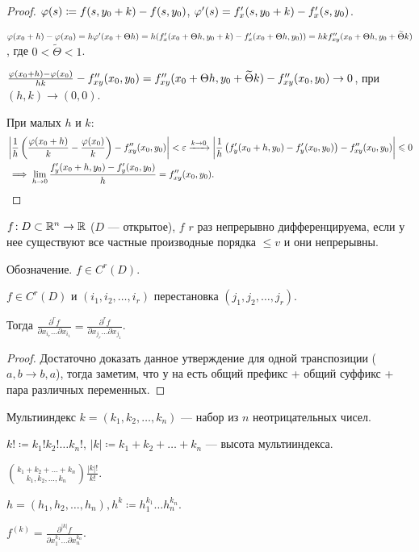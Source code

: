 \begin{proof}
    $\varphi(s) \coloneqq f(s, y_0 + k) - f(s, y_0)$, $\varphi'(s) = f'_x(s, y_0 + k) - f'_x(s, y_0)$.

    $\varphi(x_0+h) - \varphi(x_0) = h\varphi'(x_0 + \Theta h) = h(f'_x(x_0 + \Theta h, y_0 + k) - f'_x(x_0 + \Theta h, y_0)) = hk f''_{xy}(x_0 + \Theta h, y_0 + \widetilde{\Theta}k)$, где $0 < \widetilde{\Theta} < 1$.

    $\frac{\varphi(x_0 + h) - \varphi(x_0)}{hk} - f''_{xy}(x_0, y_0) = f''_{xy}(x_0 + \Theta h, y_0 + \widetilde{\Theta}k) - f''_{xy}(x_0, y_0) \to 0$, при $(h, k) \to (0, 0)$.

    При малых $h$ и  $k$:
    \begin{align*}
    &\left| \frac{1}{h} \left(\frac{\varphi(x_0 + h)}{k} - \frac{\varphi(x_0)}{k}\right) - f''_{xy}(x_0, y_0) \right| < \varepsilon
    \xrightarrow{k \to 0} \left| \frac{1}{h} \left( f'_y(x_0+h, y_0) - f'_y(x_0, y_0) \right) - f''_{xy}(x_0, y_0) \right| \leqslant 0 \\
    & \implies \lim\limits_{h \to 0} \frac{f'_y(x_0+h, y_0) - f'_y(x_0, y_0)}{h} = f''_{xy}(x_0, y_0).
    \end{align*}
\end{proof}
\begin{definition}
    $f\!: D \subset \mathbb{R}^n \to \mathbb{R}$ ($D$ --- открытое), $f$  $r$ раз непрерывно дифференцируема, если у нее существуют все частные производные порядка  $\le v$ и они непрерывны.

    Обозначение. $f \in C^r(D)$.
\end{definition}
\begin{theorem}
    $f \in C^r(D)$ и $(i_1, i_2, \ldots, i_r)$ перестановка $(j_1, j_2,\ldots,j_r)$.

Тогда $\frac{\partial^r f}{\partial x_{i_r}\ldots\partial x_{i_1}} = \frac{\partial^r f}{\partial x_{j_r} \ldots \partial x_{j_1}}$.
\end{theorem}
\begin{proof}
    Достаточно доказать данное утверждение для одной транспозиции ($a, b \to b, a$), тогда заметим, что у на есть общий префикс + общий суффикс + пара различных переменных. 
\end{proof}
\begin{definition}
    Мультииндекс $k = (k_1, k_2, \ldots, k_n)$ --- набор из $n$ неотрицательных чисел.

    $k! \coloneqq k_1!k_2!\ldots k_n!$, $|k| \coloneqq k_1 + k_2 + \ldots + k_n$ --- высота мультииндекса.

    $\binom{k_1 + k_2 + \ldots + k_n}{k_1, k_2, \ldots, k_n} \frac{|k|!}{k!}$.

    $h=(h_1, h_2, \ldots, h_n), h^k \coloneqq h_1^{k_1}\ldots h_n^{k_n}$.

    $f^{(k)} = \frac{\partial^{|k|} f}{\partial x_1^{k_1} \ldots \partial x_n^{k_n}}$.
\end{definition}

